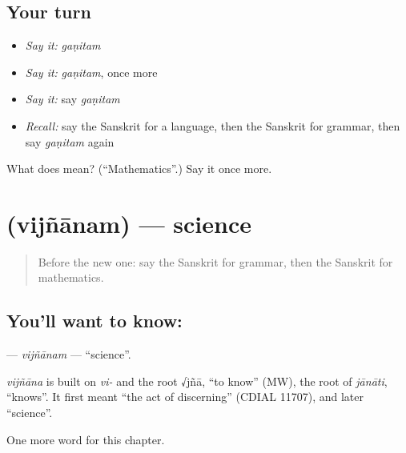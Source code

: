 \subsection*{Your turn}
\begin{itemize}
\raggedright
  \item \emph{Say it:} \emph{gaṇitam}
  \item \emph{Say it:} \emph{gaṇitam}, once more
  \item \emph{Say it:} say \emph{gaṇitam}
  \item \emph{Recall:} say the Sanskrit for a language, then the Sanskrit for grammar, then say \emph{gaṇitam} again
\end{itemize}

\begin{tcolorbox}[breakable,colback=teal!4,colframe=teal!35!black,title={Before you move on}]
What does  mean? (\textquotedblleft{}Mathematics\textquotedblright{}.) Say it once more.
\end{tcolorbox}
\section[\texorpdfstring{\sk{विज्ञानम्} (vijñānam)}{विज्ञानम् (vijñānam)}]{ (vijñānam) — science}

\label{lesson:SA-C199-vijnanam}



\begin{quote}
Before the new one: say the Sanskrit for grammar, then the Sanskrit for mathematics.
\end{quote}

\subsection*{You'll want to know: }
\textbf{} — \emph{vijñānam} — \textquotedblleft{}science\textquotedblright{}.

\begin{cousinweb}
\emph{vijñāna} is built on \emph{vi-} and the root √jñā, \textquotedblleft{}to know\textquotedblright{} (MW), the root of \emph{jānāti}, \textquotedblleft{}knows\textquotedblright{}. It first meant \textquotedblleft{}the act of discerning\textquotedblright{} (CDIAL 11707), and later \textquotedblleft{}science\textquotedblright{}.
\end{cousinweb}

\begin{grammarlens}[title={What you've built}]
One more word for this chapter.
\end{grammarlens}

